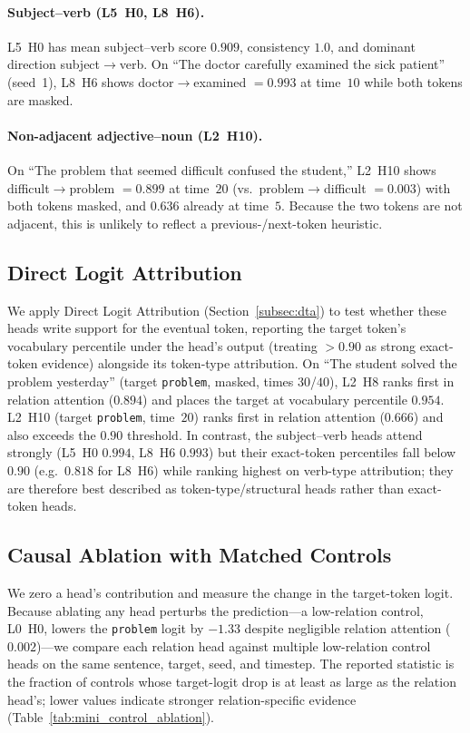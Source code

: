 \documentclass{article} %
\begin{document}
\paragraph{Subject--verb (L5~H0, L8~H6).} L5~H0 has mean subject--verb score $0.909$, consistency $1.0$, and dominant direction subject$\to$verb. On ``The doctor carefully examined the sick patient'' (seed~1), L8~H6 shows doctor$\to$examined $=0.993$ at time~$10$ while both tokens are masked.

\paragraph{Non-adjacent adjective--noun (L2~H10).} On ``The problem that seemed difficult confused the student,'' L2~H10 shows difficult$\to$problem $=0.899$ at time~$20$ (vs.\ problem$\to$difficult $=0.003$) with both tokens masked, and $0.636$ already at time~$5$. Because the two tokens are not adjacent, this is unlikely to reflect a previous-/next-token heuristic.

\subsection{Direct Logit Attribution}
We apply Direct Logit Attribution (Section~\ref{subsec:dta}) to test whether these heads write support for the eventual token, reporting the target token's vocabulary percentile under the head's output (treating $>0.90$ as strong exact-token evidence) alongside its token-type attribution. On ``The student solved the problem yesterday'' (target \texttt{problem}, masked, times $30$/$40$), L2~H8 ranks first in relation attention ($0.894$) and places the target at vocabulary percentile $0.954$. L2~H10 (target \texttt{problem}, time~$20$) ranks first in relation attention ($0.666$) and also exceeds the $0.90$ threshold. In contrast, the subject--verb heads attend strongly (L5~H0 $0.994$, L8~H6 $0.993$) but their exact-token percentiles fall below $0.90$ (e.g.\ $0.818$ for L8~H6) while ranking highest on verb-type attribution; they are therefore best described as token-type/structural heads rather than exact-token heads.

\subsection{Causal Ablation with Matched Controls}
We zero a head's contribution and measure the change in the target-token logit. Because ablating any head perturbs the prediction---a low-relation control, L0~H0, lowers the \texttt{problem} logit by $-1.33$ despite negligible relation attention ($0.002$)---we compare each relation head against multiple low-relation control heads on the same sentence, target, seed, and timestep. The reported statistic is the fraction of controls whose target-logit drop is at least as large as the relation head's; lower values indicate stronger relation-specific evidence (Table~\ref{tab:mini_control_ablation}).
\end{document}
